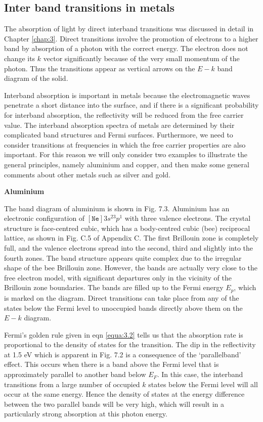 \documentclass[12pt]{book}
\begin{document}
{\subsection{Inter band transitions in metals}
The absorption of light by direct interband transitions was discussed in detail in Chapter \ref{chap:3}. Direct transitions involve the promotion of electrons to a higher band by absorption of a photon with the correct energy. The electron does not change its $k$ vector significantly because of the very small momentum of the photon. Thus the transitions appear as vertical arrows on the $E-k$ band diagram of the solid.

Interband absorption is important in metals because the electromagnetic waves penetrate a short distance into the surface, and if there is a significant probability for interband absorption, the reflectivity will be reduced from the free carrier value. The interband absorption spectra of metals are determined by their complicated band structures and Fermi surfaces. Furthermore, we need to consider transitions at frequencies in which the free carrier properties are also important. For this reason we will only consider two examples to illustrate the general principles, namely aluminium and copper, and then make some general comments about other metals such as silver and gold.

\textbf{Aluminium}

The band diagram of aluminium is shown in Fig. 7.3. Aluminium has an electronic configuration of $[\mathtt{Ne}]3s^23p^1$ with three valence electrons. The crystal structure is face-centred cubic, which has a body-centred cubic (bee) reciprocal lattice, as shown in Fig. C.5 of Appendix C. The first Brillouin zone is completely full, and the valence electrons spread into the second, third and slightly into the fourth zones. The band structure appears quite complex due to the irregular shape of the bee Brillouin zone. However, the bands are actually very close to the free electron model, with significant departures only in the vicinity of the Brillouin zone boundaries. The bands are filled up to the Fermi energy $E_p$, which is marked on the diagram. Direct transitions can take place from any of the states below the Fermi level to unoccupied bands directly above them on the $E-k$ diagram.

Fermi's golden rule given in eqn \ref{equa:3.2} tells us that the absorption rate is proportional to the density of states for the transition. The dip in the reflectivity at 1.5 eV which is apparent in Fig. 7.2 is a consequence of the `parallelband' effect. This occurs when there is a band above the Fermi level that is approximately parallel to another band below $E_F$. In this case, the interband transitions from a large number of occupied $k$ states below the Fermi level will all occur at the same energy. Hence the density of states at the energy difference between the two parallel bands will be very high, which will result in a particularly strong absorption at this photon energy.

}
\end{document}
